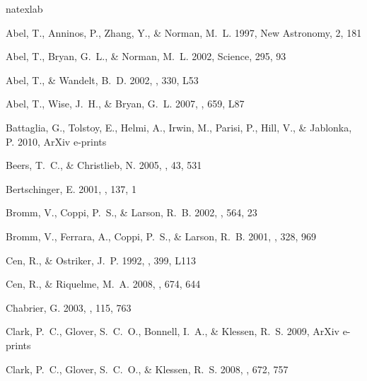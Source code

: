 \documentclass{PoS}
\begin{document}
\begin{thebibliography}{50}
\expandafter\ifx\csname natexlab\endcsname\relax\def\natexlab#1{#1}\fi

{Abel}, T., {Anninos}, P., {Zhang}, Y., \& {Norman}, M.~L. 1997, New Astronomy,
  2, 181

{Abel}, T., {Bryan}, G.~L., \& {Norman}, M.~L. 2002, Science, 295, 93

{Abel}, T., \& {Wandelt}, B.~D. 2002, \mnras, 330, L53

{Abel}, T., {Wise}, J.~H., \& {Bryan}, G.~L. 2007, \apjl, 659, L87

{Battaglia}, G., {Tolstoy}, E., {Helmi}, A., {Irwin}, M., {Parisi}, P., {Hill},
  V., \& {Jablonka}, P. 2010, ArXiv e-prints

{Beers}, T.~C., \& {Christlieb}, N. 2005, \araa, 43, 531

{Bertschinger}, E. 2001, \apjs, 137, 1

{Bromm}, V., {Coppi}, P.~S., \& {Larson}, R.~B. 2002, \apj, 564, 23

{Bromm}, V., {Ferrara}, A., {Coppi}, P.~S., \& {Larson}, R.~B. 2001, \mnras,
  328, 969

{Cen}, R., \& {Ostriker}, J.~P. 1992, \apjl, 399, L113

{Cen}, R., \& {Riquelme}, M.~A. 2008, \apj, 674, 644

{Chabrier}, G. 2003, \pasp, 115, 763

{Clark}, P.~C., {Glover}, S.~C.~O., {Bonnell}, I.~A., \& {Klessen}, R.~S. 2009,
  ArXiv e-prints

{Clark}, P.~C., {Glover}, S.~C.~O., \& {Klessen}, R.~S. 2008, \apj, 672, 757


\end{thebibliography}
\end{document}
